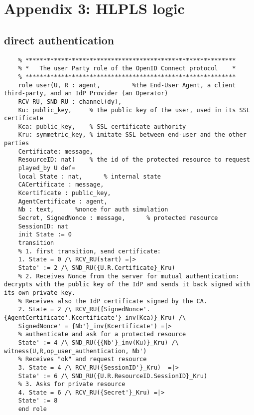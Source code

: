 \chapter{Appendix 3: HLPLS logic}
\label{appendix:hlpls}

\section{direct authentication}

	\lstset{language=HLPSL}
	\begin{lstlisting}
	% ***********************************************************
	% *   The user Party role of the OpenID Connect protocol    *
	% ***********************************************************
	role user(U, R : agent, 		%the End-User Agent, a client third-party, and an IdP Provider (an Operator)
	RCV_RU, SND_RU : channel(dy),
	Ku: public_key,		% the public key of the user, used in its SSL certificate
	Kca: public_key, 	% SSL certificate authority
	Kru: symmetric_key, % imitate SSL between end-user and the other parties
	Certificate: message,
	ResourceID: nat)	% the id of the protected resource to request
	played_by U	def=
	local State : nat, 		% internal state 
	CACertificate : message,
	Kcertificate : public_key,
	AgentCertificate : agent,
	Nb : text, 		%nonce for auth simulation
	Secret, SignedNonce : message,		% protected resource
	SessionID: nat
	init State := 0
	transition
	% 1. first transition, send certificate:
	1. State = 0 /\ RCV_RU(start) =|>
	State' := 2 /\ SND_RU({U.R.Certificate}_Kru)
	% 2. Receives Nonce from the server for mutual authentication: decrypts with the public key of the IdP and sends it back signed with its own private key.
	% Receives also the IdP certificate signed by the CA.
	2. State = 2 /\ RCV_RU({SignedNonce'.{AgentCertificate'.Kcertificate'}_inv(Kca)}_Kru) /\ 
	SignedNonce' = {Nb'}_inv(Kcertificate') =|>
	% authenticate and ask for a protected resource
	State' := 4 /\ SND_RU({{Nb'}_inv(Ku)}_Kru) /\ witness(U,R,op_user_authentication, Nb')
	% Receives "ok" and request resource
	3. State = 4 /\ RCV_RU({SessionID'}_Kru)  =|>
	State' := 6 /\ SND_RU({U.R.ResourceID.SessionID}_Kru)
	% 3. Asks for private resource
	4. State = 6 /\ RCV_RU({Secret'}_Kru) =|>
	State' := 8
	end role
	

\end{lstlisting}
